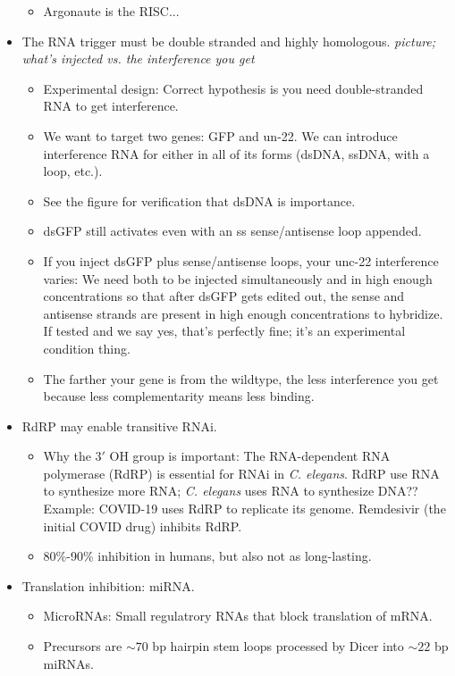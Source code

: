 \documentclass[../notes.tex]{subfiles}
\begin{document}
\begin{itemize}
\begin{itemize}
        \item Argonaute is the RISC...
    \end{itemize}
    \item The RNA trigger must be double stranded and highly homologous.
    \emph{picture; what's injected vs. the interference you get}
    \begin{itemize}
        \item Experimental design: Correct hypothesis is you need double-stranded RNA to get interference.
        \item We want to target two genes: GFP and un-22. We can introduce interference RNA for either in all of its forms (dsDNA, ssDNA, with a loop, etc.).
        \item See the figure for verification that dsDNA is importance.
        \item dsGFP still activates even with an ss sense/antisense loop appended.
        \item If you inject dsGFP plus sense/antisense loops, your unc-22 interference varies: We need both to be injected simultaneously and in high enough concentrations so that after dsGFP gets edited out, the sense and antisense strands are present in high enough concentrations to hybridize. If tested and we say yes, that's perfectly fine; it's an experimental condition thing.
        \item The farther your gene is from the wildtype, the less interference you get because less complementarity means less binding.
    \end{itemize}
    \item RdRP may enable transitive RNAi.
    \begin{itemize}
        \item Why the $3'$ OH group is important: The RNA-dependent RNA polymerase (RdRP) is essential for RNAi in \emph{C. elegans}. RdRP use RNA to synthesize more RNA; \emph{C. elegans} uses RNA to synthesize DNA?? Example: COVID-19 uses RdRP to replicate its genome. Remdesivir (the initial COVID drug) inhibits RdRP.
        \item 80\%-90\% inhibition in humans, but also not as long-lasting.
    \end{itemize}
    \item Translation inhibition: miRNA.
    \begin{itemize}
        \item MicroRNAs: Small regulatrory RNAs that block translation of mRNA.
        \item Precursors are $\sim 70$ bp hairpin stem loops processed by Dicer into $\sim 22$ bp miRNAs.

\end{itemize}
\end{itemize}
\end{document}
